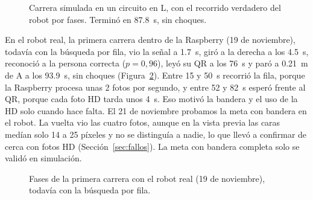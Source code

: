 \documentclass[11pt,a4paper]{article}
\newcommand{\fase}[4]{%
  \fill[#3] (#1*0.9,0) rectangle (#2*0.9,6);
  \node[font=\scriptsize\bfseries, text=white] at ({(#1+#2)/2*0.9},3) {#4};}
\begin{document}
\begin{figure}[!htbp]
  \centering
  \caption{Carrera simulada en un circuito en L, con el recorrido verdadero del robot por fases. Terminó en \SI{87,8}{\second}, sin choques.}
  \label{fig:circuito}
\end{figure}

En el robot real, la primera carrera dentro de la Raspberry (19 de noviembre), todavía con la búsqueda por fila, vio la señal a \SI{1,7}{\second}, giró a la derecha a los \SI{4,5}{\second}, reconoció a la persona correcta ($p = 0{,}96$), leyó su QR a los \SI{76}{\second} y paró a \SI{0,21}{\meter} de A a los \SI{93,9}{\second}, sin choques (Figura~\ref{fig:fases}). Entre 15 y \SI{50}{\second} recorrió la fila, porque la Raspberry procesa unas 2 fotos por segundo, y entre 52 y \SI{82}{\second} esperó frente al QR, porque cada foto HD tarda unos \SI{4}{\second}. Eso motivó la bandera y el uso de la HD solo cuando hace falta. El 21 de noviembre probamos la meta con bandera en el robot. La vuelta vio las cuatro fotos, aunque en la vista previa las caras medían solo 14 a 25 píxeles y no se distinguía a nadie, lo que llevó a confirmar de cerca con fotos HD (Sección~\ref{sec:fallos}). La meta con bandera completa solo se validó en simulación.

\begin{figure}[!htbp]
  \centering
  \caption{Fases de la primera carrera con el robot real (19 de noviembre), todavía con la búsqueda por fila.}
  \label{fig:fases}
\end{figure}
\end{document}
